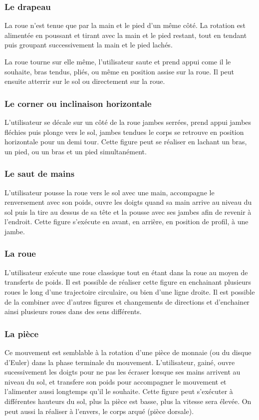 \subsubsection{Le drapeau}
La roue n'est tenue que par la main et le pied d'un même côté. La rotation est alimentée en poussant et tirant avec la main et le pied restant, tout en tendant puis groupant successivement la main et le pied lachés.

La roue tourne sur elle même, l'utilisateur saute et prend appui come il le souhaite, bras tendus, pliés, ou même en position assise sur la roue. Il peut ensuite atterrir sur le sol ou directement sur la roue.

\subsubsection{Le corner ou inclinaison horizontale}
L'utilisateur se décale sur un côté de la roue jambes serrées, prend appui jambes fléchies puis plonge vers le sol, jambes tendues le corps se retrouve en position horizontale pour un demi tour. Cette figure peut se réaliser en lachant un bras, un pied, ou un bras et un pied simultanément.

\subsubsection{Le saut de mains}
L'utilisateur pousse la roue vers le sol avec une main, accompagne le renversement avec son poids, ouvre les doigts quand sa main arrive au niveau du sol puis la tire au dessus de sa tête et la pousse avec ses jambes afin de revenir à l'endroit. Cette figure s'exécute en avant, en arrière, en position de profil, à une jambe.

\subsubsection{La roue}
L'utilisateur exécute une roue classique tout en étant dans la roue au moyen de transferts de poids. Il est possible de réaliser cette figure en enchainant plusieurs roues le long d'une trajectoire circulaire, ou bien d'une ligne droite. Il est possible de la combiner avec d'autres figures et changements de directions et d'enchainer ainsi plusieurs roues dans des sens différents.

\subsubsection{La pièce}
Ce mouvement est semblable à la rotation d'une pièce de monnaie (ou du disque d'Euler) dans la phase terminale du mouvement. L'utilisateur, gainé, ouvre sucessivement les doigts pour ne pas les écraser lorsque ses mains arrivent au niveau du sol, et transfere son poids pour accompagner le mouvement et l'alimenter aussi longtemps qu'il le souhaite. Cette figure peut s'exécuter à différentes hauteurs du sol, plus la pièce est basse, plus la vitesse sera élevée. On peut aussi la réaliser à l'envers, le corps arqué (pièce dorsale).

